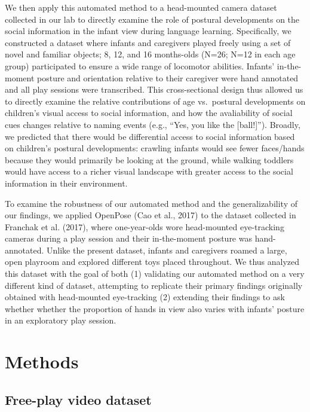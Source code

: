 \documentclass[english,man]{apa6}
\begin{document}
We then apply this automated method to a head-mounted camera dataset
collected in our lab to directly examine the role of postural
developments on the social information in the infant view during
language learning. Specifically, we constructed a dataset where infants
and caregivers played freely using a set of novel and familiar objects;
8, 12, and 16 months-olds (N=26; N=12 in each age group) participated to
ensure a wide range of locomotor abilities. Infants' in-the-moment
posture and orientation relative to their caregiver were hand annotated
and all play sessions were transcribed. This cross-sectional design thus
allowed us to directly examine the relative contributions of age
vs.~postural developments on children's visual access to social
information, and how the avaliability of social cues changes relative to
naming events (e.g., \enquote{Yes, you like the {[}ball!{]}}). Broadly,
we predicted that there would be differential access to social
information based on children's postural developments: crawling infants
would see fewer faces/hands because they would primarily be looking at
the ground, while walking toddlers would have access to a richer visual
landscape with greater access to the social information in their
environment.

To examine the robustness of our automated method and the
generalizability of our findings, we applied OpenPose (Cao et al., 2017)
to the dataset collected in Franchak et al. (2017), where one-year-olds
wore head-mounted eye-tracking cameras during a play session and their
in-the-moment posture was hand-annotated. Unlike the present dataset,
infants and caregivers roamed a large, open playroom and explored
different toys placed throughout. We thus analyzed this dataset with the
goal of both (1) validating our automated method on a very different
kind of dataset, attempting to replicate their primary findings
originally obtained with head-mounted eye-tracking (2) extending their
findings to ask whether whether the proportion of hands in view also
varies with infants' posture in an exploratory play session.

\section{Methods}\label{methods}

\subsection{Free-play video dataset}\label{free-play-video-dataset}
\end{document}
